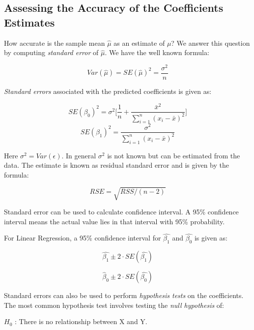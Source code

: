 \documentclass{article}
\begin{document}
	\subsection{Assessing the Accuracy of the Coefficients Estimates}
	How accurate is the sample mean $\hat{\mu}$ as an estimate of $\mu$? We answer this question by computing \textit{standard error} of $\hat{\mu}$. We have the well known formula:

	\begin{equation}
		Var(\hat{\mu}) = SE(\hat{\mu})^2 = \frac{\sigma^2}{n}
	\end{equation}

	\textit{Standard errors} associated with the predicted coefficients is given as:
	
	\begin{equation}
		SE(\beta_0)^2 = \sigma^2 \bigg[\frac{1}{n} + \frac{\bar{x}^2}{\sum_{i=1}^{n}(x_i - \bar{x})^2}\bigg]
	\end{equation}
	\begin{equation}
		SE(\beta_1)^2 = \frac{\sigma^2}{\sum_{i=1}^{n}(x_i - \bar{x})^2}
	\end{equation}

	Here $\sigma^2 = Var(\epsilon)$. In general $\sigma^2$ is not known but can be estimated from the data. The estimate is known as residual standard error and is given by the formula:
	
	\begin{equation}
		RSE = \sqrt{RSS/(n - 2)}
	\end{equation}

	Standard error can be used to calculate confidence interval. A 95\% confidence interval means the actual value lies in that interval with 95\% probability.
	
	For Linear Regression, a 95\% confidence interval for $\hat{\beta_1}$ and $\hat{\beta_0}$ is given as:
	
	\begin{equation}
		\hat{\beta_1} \pm 2 \cdot SE(\hat{\beta_1})
	\end{equation}

	\begin{equation}
		\hat\beta_0 \pm 2 \cdot SE(\hat{\beta_0})
	\end{equation}

	Standard errors can also be used to perform \textit{hypothesis tests} on the coefficients. The most common hypothesis test involves testing the \textit{null hypothesis} of:
	
	$H_0$ : There is no relationship between X and Y.
	\\
	
\end{document}
